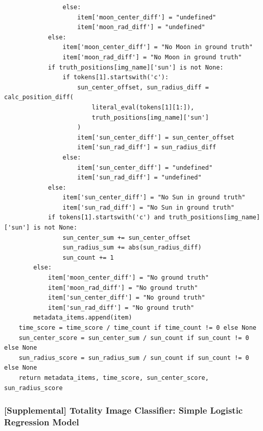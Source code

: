 \documentclass[10pt, onecolumn, draftclsnofoot, letterpaper, compsoc]{IEEEtran}
\begin{document}
\begin{verbatim}
                else:
                    item['moon_center_diff'] = "undefined"
                    item['moon_rad_diff'] = "undefined"
            else:
                item['moon_center_diff'] = "No Moon in ground truth"
                item['moon_rad_diff'] = "No Moon in ground truth"
            if truth_positions[img_name]['sun'] is not None:
                if tokens[1].startswith('c'):
                    sun_center_offset, sun_radius_diff = calc_position_diff(
                        literal_eval(tokens[1][1:]),
                        truth_positions[img_name]['sun']
                    )
                    item['sun_center_diff'] = sun_center_offset
                    item['sun_rad_diff'] = sun_radius_diff
                else:
                    item['sun_center_diff'] = "undefined"
                    item['sun_rad_diff'] = "undefined"
            else:
                item['sun_center_diff'] = "No Sun in ground truth"
                item['sun_rad_diff'] = "No Sun in ground truth"
            if tokens[1].startswith('c') and truth_positions[img_name]['sun'] is not None:
                sun_center_sum += sun_center_offset
                sun_radius_sum += abs(sun_radius_diff)
                sun_count += 1
        else:
            item['moon_center_diff'] = "No ground truth"
            item['moon_rad_diff'] = "No ground truth"
            item['sun_center_diff'] = "No ground truth"
            item['sun_rad_diff'] = "No ground truth"
        metadata_items.append(item)
    time_score = time_score / time_count if time_count != 0 else None
    sun_center_score = sun_center_sum / sun_count if sun_count != 0 else None
    sun_radius_score = sun_radius_sum / sun_count if sun_count != 0 else None
    return metadata_items, time_score, sun_center_score, sun_radius_score
\end{verbatim}

\newpage
\subsubsection{[Supplemental] Totality Image Classifier: Simple Logistic Regression Model}
\end{document}
